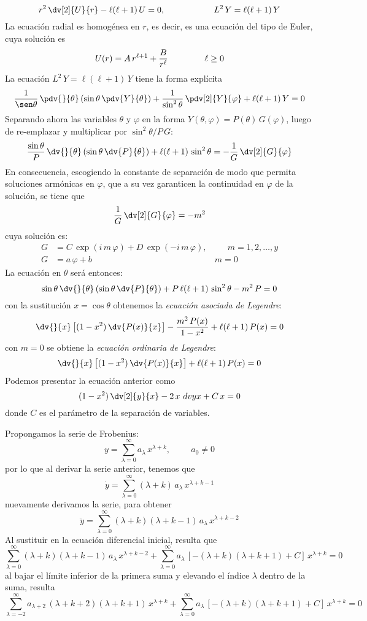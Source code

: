 \[ r^{2} \, \dv[2]{U}{r} - \ell (\ell + 1) \, U = 0, \hspace{2cm} L^{2} \, Y = \ell(\ell + 1) \, Y  \]
La ecuación radial es homogénea en $r$, es decir, es una ecuación del tipo de Euler, cuya solución es
\[ U(r) = A \, r^{\ell +1} + \dfrac{B}{r^{\ell}} \hspace{1.5cm} \ell \geq 0 \]
La ecuación $L^{2} \, Y = \ell (\ell + 1) \, Y$ tiene la forma explícita
\[ \dfrac{1}{\sen \theta} \, \pdv{}{\theta} \left( \sin \theta \, \pdv{Y}{\theta} \right) + \dfrac{1}{\sin^{2} \theta} \, \pdv[2]{Y}{\varphi} + \ell (\ell +1) \, Y = 0 \]
Separando ahora las variables $\theta$ y $\varphi$ en la forma $Y(\theta, \varphi) = P(\theta) \, G(\varphi)$, luego de re-emplazar y multiplicar por $\sin^{2} \theta / P \, G$:
\[ \dfrac{\sin \theta}{P} \, \dv{}{\theta} \left( \sin \theta \, \dv{P}{\theta} \right) + \ell (\ell + 1) \, \sin^{2} \theta = - \dfrac{1}{G} \, \dv[2]{G}{\varphi}  \]
En consecuencia, escogiendo la constante de separación de modo que permita soluciones armónicas en $\varphi$, que a su vez garanticen la continuidad en $\varphi$ de la solución, se tiene que
\[ \dfrac{1}{G} \, \dv[2]{G}{\varphi} = -m^{2} \]
cuya solución es:
\begin{align*}
G &= C \, \exp(i \, m \, \varphi) + D \, \exp(-i \, m \, \varphi), \hspace{1cm} m = 1, 2, \ldots, y \\
G &= a \, \varphi + b \hspace{6cm} m = 0
\end{align*}
La ecuación en $\theta$ será entonces:
\[ \sin \theta \, \dv{}{\theta} \left( \sin \theta \, \dv{P}{\theta} \right) + P \, \ell (\ell + 1) \, \sin^{2} \theta - m^{2} \, P = 0 \]
con la sustitución $x = \cos \theta$ obtenemos la \emph{ecuación asociada de Legendre}:
\[ \dv{}{x} \left[ (1 -x^{2}) \, \dv{P(x)}{x} \right] - \dfrac{m^{2} \, P(x)}{1- x^{2}} + \ell (\ell + 1) \, P(x) = 0 \]
con $m=0$ se obtiene la \emph{ecuación ordinaria de Legendre}:
\[ \dv{}{x} \left[ (1 -x^{2}) \, \dv{P(x)}{x} \right] + \ell (\ell + 1) \, P(x) = 0 \]
Podemos presentar la ecuación anterior como
\[ (1 - x^{2}) \, \dv[2]{y}{x} - 2 \, x \, \, dv{y}{x} + C \, x = 0 \]
donde $C$ es el parámetro de la separación de variables.
\par
Propongamos la serie de Frobenius:
\[ y = \sum_{\lambda=0}^{\infty} a_{\lambda} \, x^{\lambda + k} , \hspace{1cm} a_{0} \neq 0 \]
por lo que al derivar la serie anterior, tenemos que
\[ \dot{y} = \sum_{\lambda=0}^{\infty} (\lambda + k ) \, a_{\lambda} \, x^{\lambda + k - 1} \]
nuevamente derivamos la serie, para obtener
\[ \ddot{y} = \sum_{\lambda=0}^{\infty} (\lambda + k )(\lambda + k - 1) \, a_{\lambda} \, x^{\lambda + k - 2} \]
Al sustituir en la ecuación diferencial inicial, resulta que
\[ \sum_{\lambda=0}^{\infty} (\lambda + k )(\lambda + k - 1) \, a_{\lambda} \, x^{\lambda + k - 2} + \sum_{\lambda=0}^{\infty} a_{\lambda} \, [-(\lambda + k)(\lambda + k + 1) + C] \, x^{\lambda + k} = 0 \]
al bajar el límite inferior de la primera suma y elevando el índice $\lambda$ dentro de la suma, resulta
\[ \sum_{\lambda=-2}^{\infty} a_{\lambda + 2} \, (\lambda + k + 2)(\lambda + k + 1) \, x^{\lambda + k} + \sum_{\lambda=0}^{\infty} a_{\lambda} \, [-(\lambda + k)(\lambda + k + 1) + C] \, x^{\lambda + k} = 0 \]
